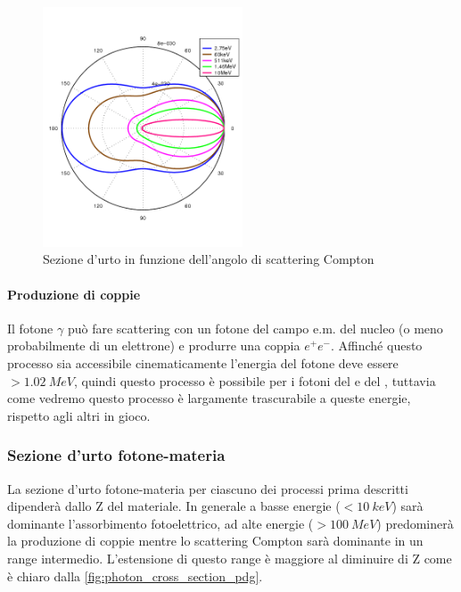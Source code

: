  \begin{figure}[h]
 	\centering
 	\includegraphics[width=16em]{klein-nishina}
 	\caption{\label{fig:klein-nishina}Sezione d'urto in funzione dell'angolo di scattering Compton}
 \end{figure}

 \paragraph{Produzione di coppie}
 Il fotone $\gamma$ può fare scattering con un fotone del campo e.m. del nucleo (o meno probabilmente di un elettrone) e produrre una coppia $e^+e^-$. Affinché questo processo sia accessibile cinematicamente l'energia del fotone deve essere $> \SI{1.02}{MeV}$, quindi questo processo è possibile per i fotoni del \co\;  e del \na, tuttavia come vedremo questo processo è largamente trascurabile a queste energie, rispetto agli altri in gioco.
 
 \subsubsection{Sezione d'urto fotone-materia}
 La sezione d'urto fotone-materia per ciascuno dei processi prima descritti dipenderà dallo Z del materiale. In generale a basse energie ($ < \SI{10}{keV}$) sarà dominante l'assorbimento fotoelettrico, ad alte energie ($>\SI{100}{MeV}$) predominerà la produzione di coppie mentre lo scattering Compton sarà dominante in un range intermedio. L'estensione di questo range è maggiore al diminuire di Z come è chiaro dalla \autoref{fig:photon_cross_section_pdg}.
 
